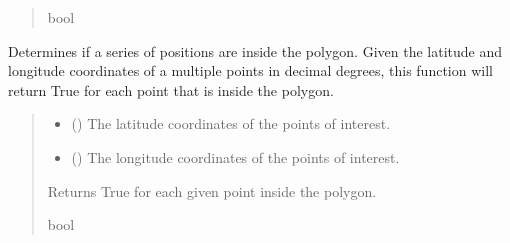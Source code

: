 \documentclass[letterpaper,10pt,english]{sphinxmanual}
\begin{document}
\begin{fulllineitems}
\begin{fulllineitems}
\begin{quote}
\begin{description}
\sphinxAtStartPar
bool

\end{description}\end{quote}

\end{fulllineitems}


\begin{fulllineitems}
\label{\detokenize{modules/gps/zones:qnav.gps.zones.Polygon.is_points_inside}}
\pysigstartsignatures
{}
\pysigstopsignatures
\sphinxAtStartPar
Determines if a series of positions are inside the polygon.
Given the latitude and longitude coordinates of a multiple points
in decimal degrees, this function will return True for each point
that is inside the polygon.
\begin{quote}\begin{description}
\begin{itemize}
\item {} 
\sphinxAtStartPar
{} () \textendash{} The latitude coordinates of the points of interest.

\item {} 
\sphinxAtStartPar
{} () \textendash{} The longitude coordinates of the points of interest.

\end{itemize}

\sphinxAtStartPar
Returns True for each given point inside the polygon.

\sphinxAtStartPar
bool

\end{description}\end{quote}

\end{fulllineitems}



\end{fulllineitems}
\end{document}
